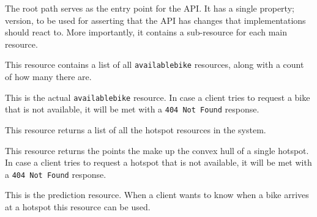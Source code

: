 {The root path serves as the entry point for the API.
It has a single property; version, to be used for asserting that the API has changes that implementations should react to.
More importantly, it contains a sub-resource for each main resource.}

{This resource contains a list of all \texttt{availablebike} resources, along with a count of how many there are.}


{This is the actual \texttt{availablebike} resource.
In case a client tries to request a bike that is not available, it will be met with a \texttt{404 Not Found} response.}


{This resource returns a list of all the hotspot resources in the system.}

{This resource returns the points the make up the convex hull of a single hotspot.
In case a client tries to request a hotspot that is not available, it will be met with a \texttt{404 Not Found} response.}


{This is the prediction resource.
When a client wants to know when a bike arrives at a hotspot this resource can be used.}


